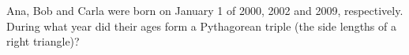 Ana, Bob and Carla were born on January 1 of 2000, 2002 and 2009, respectively. During what year did their ages form a Pythagorean triple (the side lengths of a right triangle)?
